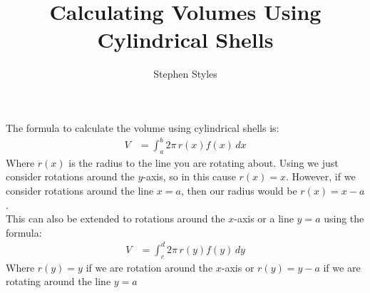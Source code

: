 \documentclass[16pt]{article}
\title{Calculating Volumes Using Cylindrical Shells}
\author{Stephen Styles}
\theoremstyle{remark}
\begin{document}
\maketitle

The formula to calculate the volume using cylindrical shells is:
\begin{align*}
V&= \int_a^b 2\pi\, r(x) f(x) \, dx
\end{align*}
Where $r(x)$ is the radius to the line you are rotating about. Using we just consider rotations around the $y$-axis, so in this cause $r(x)=x$. However, if we consider rotations around the line $x=a$, then our radius would be $r(x)=x-a$.\\

This can also be extended to rotations around the $x$-axis or a line $y=a$ using the formula:
\begin{align*}
V&= \int_c^d 2\pi\, r(y) f(y) \, dy
\end{align*}
Where $r(y)=y$ if we are rotation around the $x$-axis or $r(y) = y-a$ if we are rotating around the line $y=a$\\
\end{document}
